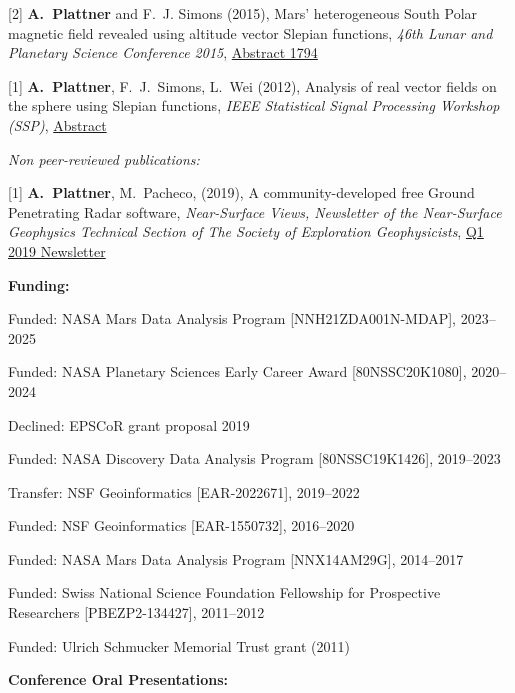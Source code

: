 \documentclass[10pt]{article}
\begin{document}
\spcp
\hspace{-0.5cm}[2] \textbf{A.~Plattner} and F.~J. Simons (2015),
Mars' heterogeneous South Polar magnetic field revealed using altitude vector Slepian functions,
\emph{46th Lunar and Planetary Science Conference 2015},
\href{http://www.hou.usra.edu/meetings/lpsc2015/pdf/1794.pdf}{Abstract 1794}

\spcp
\hspace{-0.5cm}[1] \textbf{A.~Plattner}, F.~J.~Simons, L.~Wei (2012),
Analysis of real vector fields on the sphere using Slepian functions,
\emph{IEEE Statistical Signal Processing Workshop (SSP)},
\href{http://ieeexplore.ieee.org/stamp/stamp.jsp?tp=&arnumber=6319659}{Abstract}

\spc
\emph{Non peer-reviewed publications:}

\spcp
\hspace{-0.5cm}[1] \textbf{A.~Plattner}, M.~Pacheco, (2019), A
community-developed free Ground Penetrating Radar software,
\emph{Near-Surface Views, Newsletter of the Near-Surface Geophysics
  Technical Section of The Society of Exploration Geophysicists},
\href{https://seg.org/Portals/0/SEG/News%20and%20Resources/Near%20Surface/Near%20Surface%20Newsletter/2011-present/2019_Q1.pdf}{Q1
  2019 Newsletter}


\spc
\textbf{\tsize Funding:}

\spcp
Funded: NASA Mars Data Analysis Program [NNH21ZDA001N-MDAP], 2023--2025

\spcp
Funded: NASA Planetary Sciences Early Career Award [80NSSC20K1080], 2020--2024

\spcp Declined: EPSCoR grant proposal 2019

\spcp
Funded: NASA Discovery Data Analysis Program [80NSSC19K1426], 2019--2023

\spcp
Transfer: NSF Geoinformatics [EAR-2022671], 2019--2022 

\spcp
  Funded: NSF Geoinformatics
  [EAR-1550732],
  2016--2020

 \spcp 
Funded: NASA Mars Data Analysis Program [NNX14AM29G], 2014--2017

\spcp Funded: Swiss National Science Foundation Fellowship for Prospective Researchers
[PBEZP2-134427], 2011--2012

\spcp
Funded: Ulrich Schmucker Memorial Trust grant (2011)


\spc
\textbf{\tsize Conference Oral Presentations:}
\end{document}
